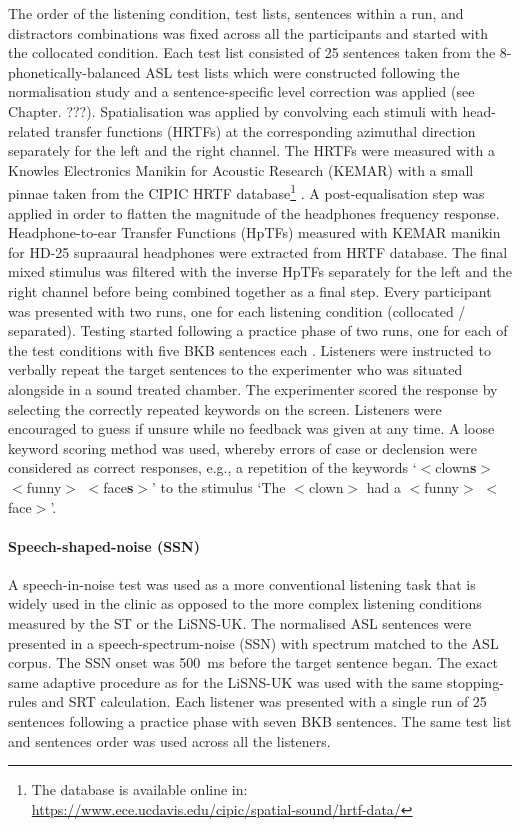 \documentclass[a4paper, twoside]{templates/ociamthesis}
\begin{document}
The order of the listening condition, test lists, sentences within a run, and distractors combinations was fixed across all the participants and started with the collocated condition. Each test list consisted of 25 sentences taken from the 8-phonetically-balanced ASL test lists which were constructed following the normalisation study and a sentence-specific level correction was applied (see Chapter. ???). Spatialisation was applied by convolving each stimuli with head-related transfer functions (HRTFs) at the corresponding azimuthal direction separately for the left and the right channel. The HRTFs were measured with a Knowles Electronics Manikin for Acoustic Research (KEMAR) with a small pinnae taken from the CIPIC HRTF database\footnote{The database is available online in: \url{https://www.ece.ucdavis.edu/cipic/spatial-sound/hrtf-data/}} \autocite[see][``special'' HRTF data]{Algazi2001}. A post-equalisation step was applied in order to flatten the magnitude of the headphones frequency response. Headphone-to-ear Transfer Functions (HpTFs) measured with KEMAR manikin for HD-25 supraaural headphones were extracted from \textcite{Wierstorf2011} HRTF database. The final mixed stimulus was filtered with the inverse HpTFs separately for the left and the right channel before being combined together as a final step. Every participant was presented with two runs, one for each listening condition (collocated / separated). Testing started following a practice phase of two runs, one for each of the test conditions with five BKB sentences each \autocite{Bench1979}. Listeners were instructed to verbally repeat the target sentences to the experimenter who was situated alongside in a sound treated chamber. The experimenter scored the response by selecting the correctly repeated keywords on the screen. Listeners were encouraged to guess if unsure while no feedback was given at any time. A loose keyword scoring method was used, whereby errors of case or declension were considered as correct responses, e.g., a repetition of the keywords `\(<\)clown\textbf{s}\(>\) \(<\)funny\(>\) \(<\)face\textbf{s}\(>\)' to the stimulus `The \(<\)clown\(>\) had a \(<\)funny\(>\) \(<\)face\(>\)'.

\hypertarget{speech-shaped-noise-ssn}{%
\paragraph{Speech-shaped-noise (SSN)}\label{speech-shaped-noise-ssn}}

\hfill\break
A speech-in-noise test was used as a more conventional listening task that is widely used in the clinic as opposed to the more complex listening conditions measured by the ST or the LiSNS-UK. The normalised ASL sentences were presented in a speech-spectrum-noise (SSN) with spectrum matched to the ASL corpus. The SSN onset was 500~ms before the target sentence began. The exact same adaptive procedure as for the LiSNS-UK was used with the same stopping-rules and SRT calculation. Each listener was presented with a single run of 25 sentences following a practice phase with seven BKB sentences. The same test list and sentences order was used across all the listeners.
\end{document}
